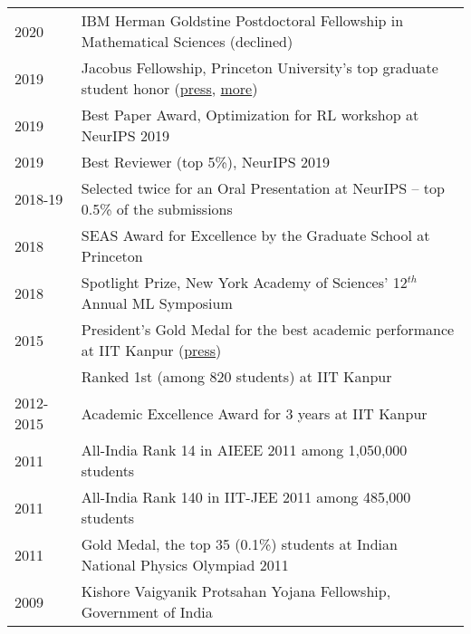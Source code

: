 \documentclass{scrartcl}
\begin{document}
\begin{cv}{}
\begin{center}
    \begin{tabularx}{\textwidth}{ l l }
     2020 & IBM Herman Goldstine Postdoctoral Fellowship in Mathematical Sciences (declined)\\
     2019 & {Jacobus Fellowship}, Princeton University's top graduate student honor (\href{https://www.princeton.edu/news/2020/02/13/four-win-jacobus-fellowship-princetons-top-graduate-student-honor}{press}, \href{https://www.dailyprincetonian.com/article/2020/02/four-graduate-students-named-jacobus-fellows}{more})\\ 
     2019 & {Best Paper Award}, Optimization for RL workshop at NeurIPS 2019 \\
     2019 & Best Reviewer (top 5\%), NeurIPS 2019\\
     2018-19 & Selected {twice} for an {Oral Presentation} at NeurIPS -- top 0.5\% of the submissions \\
     2018 & {SEAS Award for Excellence} by the Graduate School at Princeton\\  
     2018 & {Spotlight Prize}, New York Academy of Sciences' 12$^{th}$ Annual ML Symposium \\
     2015 & {President's Gold Medal} for the best academic performance at IIT Kanpur (\href{https://timesofindia.indiatimes.com/director-iit-k-prof-indranil-manna-informed-that-while-the-presidents-gold-medal-will-be-given-to-karan-singh-of-computer-science-and-engineering-department-directors-gold-medal-will-be-awarded-to-sarthak-chandra-of-physics-department-/articleshow/47568494.cms}{press})\\
     & Ranked 1st (among
     820 students) at IIT Kanpur\\
     2012-2015 & Academic Excellence Award for 3 years at IIT Kanpur \\
     2011 & All-India Rank 14 in AIEEE
     2011 among 1,050,000 students \\
     2011 & All-India Rank 140 in IIT-JEE 2011 among 485,000 students\\
     2011 & Gold Medal, the top 35 (0.1\%) students at Indian
     National Physics Olympiad 2011\\
     2009 & Kishore Vaigyanik Protsahan Yojana Fellowship, Government of India    
    \end{tabularx}
\end{center}

\vspace{1em}


\end{cv}
\end{document}
